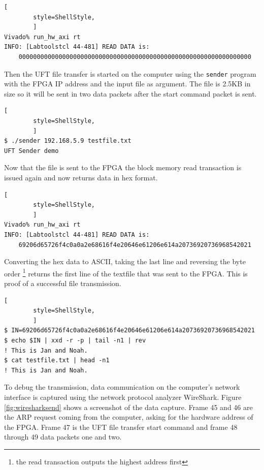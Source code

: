 \vspace{1ex}
    \begin{lstlisting}[
        style=ShellStyle, 
        ]
Vivado% run_hw_axi rt
INFO: [Labtoolstcl 44-481] READ DATA is: 
    0000000000000000000000000000000000000000000000000000000000000000
\end{lstlisting}
\vspace{1ex}

Then the UFT file transfer is started on the computer using the \texttt{sender}
program with the FPGA IP address and the input file as argument. The file is
2.5KB in size so it will be sent in two data packets after the start command
packet is sent.

\vspace{1ex}
    \begin{lstlisting}[
        style=ShellStyle, 
        ]
$ ./sender 192.168.5.9 testfile.txt
UFT Sender demo
\end{lstlisting}
\vspace{1ex}

Now that the file is sent to the FPGA the block memory read transaction is
issued again and now returns data in hex format.

\vspace{1ex}
    \begin{lstlisting}[
        style=ShellStyle, 
        ]
Vivado% run_hw_axi rt
INFO: [Labtoolstcl 44-481] READ DATA is: 
    69206d65726f4c0a0a2e68616f4e20646e61206e614a20736920736968542021
\end{lstlisting}
\vspace{1ex}

Converting the hex data to ASCII, taking the last line and reversing the byte
order \footnote{the read transaction outputs the highest address first}
returns the first line of the textfile that was sent to the FPGA. This is proof
of a successful file transmission.

\vspace{1ex}
    \begin{lstlisting}[
        style=ShellStyle, 
        ]
$ IN=69206d65726f4c0a0a2e68616f4e20646e61206e614a20736920736968542021
$ echo $IN | xxd -r -p | tail -n1 | rev
! This is Jan and Noah.
$ cat testfile.txt | head -n1
! This is Jan and Noah.
\end{lstlisting}
\vspace{1ex}

To debug the transmission, data communication on the computer's network
interface is captured using the network protocol analyzer WireShark. Figure 
\ref{fig:wiresharksend} shows a screenshot of the data capture. Frame 45 and 46
are the ARP request coming from the computer, asking for the hardware address of
the FPGA. Frame 47 is the UFT file transfer start command and frame 48 through
49 data packets one and two.

